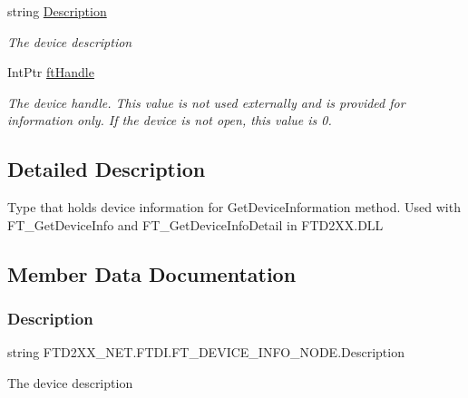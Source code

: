 \begin{DoxyCompactItemize}
string \mbox{\hyperlink{class_f_t_d2_x_x___n_e_t_1_1_f_t_d_i_1_1_f_t___d_e_v_i_c_e___i_n_f_o___n_o_d_e_ad0da30f3b5ef9a52a58382f9abbc18c3}{Description}}
\begin{DoxyCompactList}\small\item\em The device description \end{DoxyCompactList}\item 
Int\+Ptr \mbox{\hyperlink{class_f_t_d2_x_x___n_e_t_1_1_f_t_d_i_1_1_f_t___d_e_v_i_c_e___i_n_f_o___n_o_d_e_a788d92578ee6ed99c0b125329d678b1a}{ft\+Handle}}
\begin{DoxyCompactList}\small\item\em The device handle. This value is not used externally and is provided for information only. If the device is not open, this value is 0. \end{DoxyCompactList}\end{DoxyCompactItemize}


\subsection{Detailed Description}
Type that holds device information for Get\+Device\+Information method. Used with F\+T\+\_\+\+Get\+Device\+Info and F\+T\+\_\+\+Get\+Device\+Info\+Detail in F\+T\+D2\+X\+X.\+D\+LL 



\subsection{Member Data Documentation}
\mbox{\label{class_f_t_d2_x_x___n_e_t_1_1_f_t_d_i_1_1_f_t___d_e_v_i_c_e___i_n_f_o___n_o_d_e_ad0da30f3b5ef9a52a58382f9abbc18c3}} 
\subsubsection{\texorpdfstring{Description}{Description}}
{\footnotesize\ttfamily string F\+T\+D2\+X\+X\+\_\+\+N\+E\+T.\+F\+T\+D\+I.\+F\+T\+\_\+\+D\+E\+V\+I\+C\+E\+\_\+\+I\+N\+F\+O\+\_\+\+N\+O\+D\+E.\+Description}



The device description 

